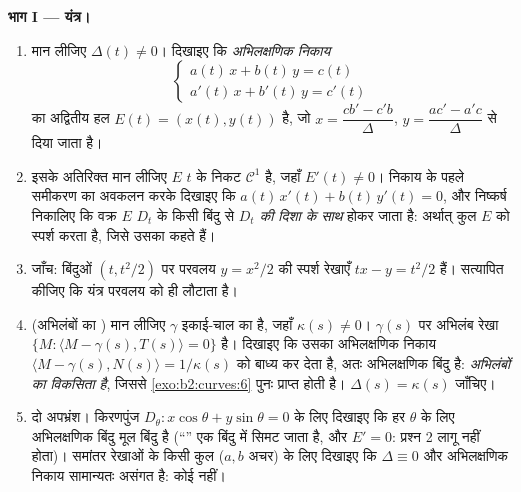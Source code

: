 \begin{problem}[{सप्ताहांत समस्या --- अन्वालोप यंत्र और
चार शास्त्रीय वक्र}]
\medskip
\noindent\textbf{भाग I ---  यंत्र।}
\begin{enumerate}
  \item मान लीजिए $\Delta(t) \neq 0$। दिखाइए कि
        \emph{अभिलक्षणिक निकाय}
        \[
        \begin{cases} a(t)\,x + b(t)\,y = c(t)\\
        a'(t)\,x + b'(t)\,y = c'(t)\end{cases}
        \]
        का अद्वितीय हल $E(t) = (x(t), y(t))$ है, जो
        $x = \dfrac{cb' - c'b}{\Delta}$, $y = \dfrac{ac' -
        a'c}{\Delta}$ से दिया जाता है।
  \item इसके अतिरिक्त मान लीजिए $E$ $t$ के निकट $\mathcal C^1$ है,
        जहाँ $E'(t) \neq 0$। निकाय के पहले समीकरण का
        अवकलन करके दिखाइए कि $a(t)\,x'(t) +
        b(t)\,y'(t) = 0$, और निष्कर्ष निकालिए कि वक्र $E$
        $D_t$ के किसी बिंदु से \emph{$D_t$ की दिशा के
        साथ} होकर जाता है: अर्थात् कुल $E$ को स्पर्श करता है,
        जिसे उसका \emph{} कहते हैं।
  \item जाँच: बिंदुओं $(t, t^2/2)$ पर परवलय $y =
        x^2/2$ की स्पर्श रेखाएँ $tx - y =
        t^2/2$ हैं। सत्यापित कीजिए कि 
        यंत्र परवलय को ही लौटाता है।
  \item (अभिलंबों का ) मान लीजिए $\gamma$ इकाई-चाल का है,
        जहाँ $\kappa(s) \neq 0$। $\gamma(s)$ पर अभिलंब रेखा
        $\{M : \langle M - \gamma(s), T(s)
        \rangle = 0\}$ है। दिखाइए कि उसका अभिलक्षणिक निकाय
        $\langle M - \gamma(s), N(s)\rangle =
        1/\kappa(s)$ को बाध्य कर देता है, अतः अभिलक्षणिक बिंदु
         है: \emph{अभिलंबों का  विकसिता है},
        जिससे \cref{exo:b2:curves:6} पुनः प्राप्त होती है। $\Delta(s) =
        \kappa(s)$ जाँचिए।
  \item दो अपभ्रंश। किरणपुंज $D_\theta : x\cos
        \theta + y\sin\theta = 0$ के लिए दिखाइए कि हर $\theta$
        के लिए अभिलक्षणिक बिंदु मूल बिंदु है (``'' एक
        बिंदु में सिमट जाता है, और $E' = 0$: प्रश्न 2 लागू नहीं
        होता)। समांतर रेखाओं के किसी कुल ($a, b$ अचर) के लिए
        दिखाइए कि $\Delta \equiv 0$ और अभिलक्षणिक निकाय सामान्यतः
        असंगत है: कोई  नहीं।
\end{enumerate}


\end{problem}
